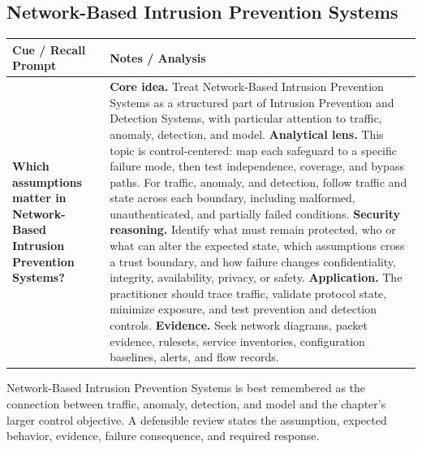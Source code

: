 \documentclass[11pt]{article}
\newcommand{\CornellHeader}{%
\rowcolor{Navy}\color{white}\bfseries Cue / Recall Prompt & \color{white}\bfseries Notes / Analysis\\\hline}
\newcommand{\CornellRow}[2]{%
\cellcolor{CueGray}\RaggedRight\textbf{#1} & \RaggedRight #2\\\hline}
\begin{document}
\subsection*{Network-Based Intrusion Prevention Systems}
\begin{longtable}{>{\RaggedRight\arraybackslash}p{}|>{\RaggedRight\arraybackslash}p{}}
\CornellHeader
\CornellRow{Which assumptions matter in Network-Based Intrusion Prevention Systems?}{\textbf{Core idea.} Treat Network-Based Intrusion Prevention Systems as a structured part of Intrusion Prevention and Detection Systems, with particular attention to traffic, anomaly, detection, and model. \textbf{Analytical lens.} This topic is control-centered: map each safeguard to a specific failure mode, then test independence, coverage, and bypass paths. For traffic, anomaly, and detection, follow traffic and state across each boundary, including malformed, unauthenticated, and partially failed conditions. \textbf{Security reasoning.} Identify what must remain protected, who or what can alter the expected state, which assumptions cross a trust boundary, and how failure changes confidentiality, integrity, availability, privacy, or safety. \textbf{Application.} The practitioner should trace traffic, validate protocol state, minimize exposure, and test prevention and detection controls. \textbf{Evidence.} Seek network diagrams, packet evidence, rulesets, service inventories, configuration baselines, alerts, and flow records.}
\end{longtable}
\begin{topicsummary}
Network-Based Intrusion Prevention Systems is best remembered as the connection between traffic, anomaly, detection, and model and the chapter's larger control objective. A defensible review states the assumption, expected behavior, evidence, failure consequence, and required response.
\end{topicsummary}
\end{document}
